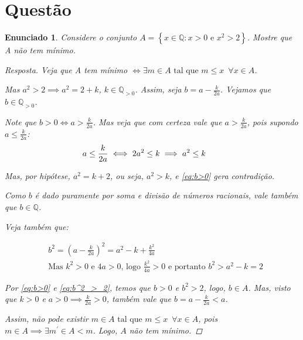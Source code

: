 \documentclass[a4paper,twoside,11pt]{article}
\newtheorem*{enunciado}{Enunciado}
\begin{document}
\section{Questão}
\begin{enunciado}
    Considere o conjunto $A = \left\{ x \in \mathbb{Q} : x > 0 \text{ e } x^2 > 2 \right\}$.
    Mostre que A não tem mínimo.

    \begin{proof}[Resposta]
        Veja que A tem mínimo $\iff \exists m \in A \text{ tal que } m \leq x \enspace \forall x \in A$.

        Mas $a^2 > 2 \implies a^2 = 2 + k$, $k \in \mathbb{Q}_{>0}$.
        Assim, seja $b = a - \frac{k}{2a}$. Vejamos que $b \in \mathbb{Q}_{>0}$.
        
        Note que $b > 0 \iff a > \frac{k}{2a}$. Mas veja que com certeza vale que
        $a > \frac{k}{2a}$, pois supondo $a \leq \frac{k}{2a}$:
        \begin{equation} \label{eq:b>0}
            \begin{split}
                    a \leq \frac{k}{2a} \iff 2a^2 \leq k \implies a^2 \leq k \text
                    \qquad 
            \end{split}
        \end{equation}

        Mas, por hipótese, $a^2 = k + 2$, ou seja, $a^2 > k$, e \ref{eq:b>0} gera
        contradição.

        Como $b$ é dado puramente por soma e divisão de números racionais, vale também que
        $b \in \mathbb{Q}$.

        Veja também que:

        \begin{equation} \label{eq:b^2_>_2}
            \begin{split}
                &b^2 = (a - \frac{k}{2a})^2 = a^2 - k + \frac{k^2}{4a} \\
                &\text{Mas } k^2 > 0 \text{ e } 4a > 0\text{, logo } \frac{k^2}{4a} > 0 \text{ e portanto } b^2 > a^2 - k = 2
            \end{split}
        \end{equation}

        Por \ref{eq:b>0} e \ref{eq:b^2_>_2}, temos que $b > 0$ e $b^2 > 2$, logo,
        $b \in A$. Mas, visto que $k > 0$ e $a > 0 \implies \frac{k}{2a} > 0$,
        também vale que $b = a - \frac{k}{2a} < a$.

        Assim, não pode existir
        $m \in A \text{ tal que } m \leq x \enspace \forall x \in A $, pois
        $m \in A \implies \exists m^{\prime} \in A < m$. Logo, $A$ não tem mínimo.
    \end{proof}
\end{enunciado}
\end{document}
